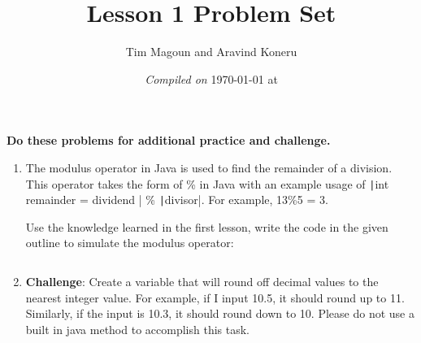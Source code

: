 \documentclass[11pt,fleqn]{article}
\newcommand{\mil}[2][java]{\texttt|#2|}
\begin{document}
\title{Lesson 1 Problem Set}%
\author{Tim Magoun and Aravind Koneru}
\date{\textit{Compiled on} \today \hspace{1mm} at \currenttime}
\maketitle

\begin{center}
\textbf{Do these problems for additional practice and challenge.}
\end{center}

\begin{enumerate}
\item 
The modulus operator in Java is used to find the remainder of a division. This operator takes the
form of \% in Java with an example usage of \mil{int remainder = dividend } \% \mil{divisor}. For example,
13\%5 = 3. 

Use the knowledge learned in the first lesson, write the code in the given outline to simulate the modulus operator:
\inputminted{java}{../src/Modulus.java}

\item
\textbf{Challenge}:
Create a variable that will round off decimal values to the nearest integer value. For example, if I input
10.5, it should round up to 11. Similarly, if the input is 10.3, it should round down to 10. Please do
not use a built in java method to accomplish this task. 

\inputminted{java}{../src/Rounder.java}

\end{enumerate}
\end{document}
